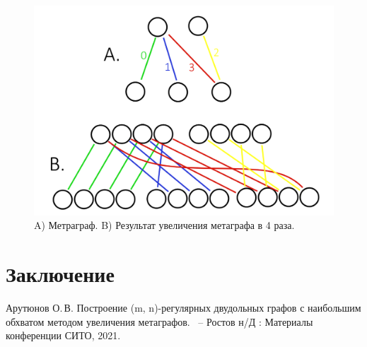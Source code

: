 \documentclass[14pt]{mmcs_article}
\begin{document}
\begin{figure}[H]
  \centering
  \includegraphics[scale=0.5]{Fig_8.png}
  \caption{ A) Метраграф. B) Результат увеличения метаграфа в 4 раза. }
  \label{stud:metagraph:1}
\end{figure}
  

\newpage
{}
\section*{Заключение}


\newpage

\renewcommand{\refname}{\centering \textbf{Литература}}

\begin{thebibliography}{0}

Арутюнов О.\,В.
Построение (m, n)-регулярных двудольных графов с наибольшим обхватом методом увеличения метаграфов.
~-- Ростов н/Д : Материалы конференции СИТО, 2021.

\end{thebibliography}
\end{document}
